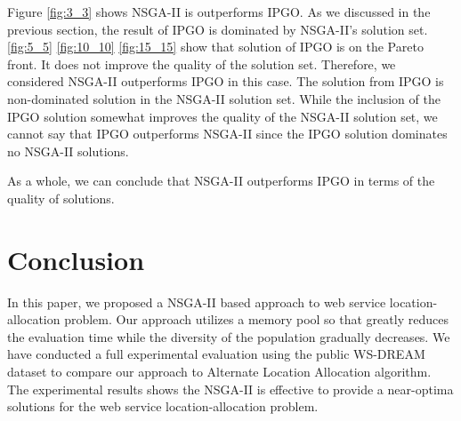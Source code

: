 \documentclass{llncs}
\begin{document}
Figure \ref{fig:3_3} shows NSGA-II is outperforms IPGO. As we discussed in the previous section, the 
result of IPGO is dominated by NSGA-II's solution set. \ref{fig:5_5} \ref{fig:10_10} \ref{fig:15_15} show that solution of IPGO is on the Pareto front. It does not improve the quality of the solution
set. Therefore, we considered NSGA-II outperforms IPGO in this case. The solution from IPGO is non-dominated solution in the NSGA-II solution set. While the inclusion
of the IPGO solution somewhat improves the quality of the NSGA-II solution set, we cannot say that IPGO outperforms NSGA-II since the 
IPGO solution dominates no NSGA-II solutions.

As a whole, we can conclude that NSGA-II outperforms IPGO in terms of the quality of solutions.


\section{Conclusion}
In this paper, we proposed a NSGA-II based approach to web service location-allocation problem. Our approach utilizes a memory pool so that
greatly reduces the evaluation time while the diversity of the population gradually decreases. We have conducted a full experimental evaluation using the public WS-DREAM dataset to compare our approach to Alternate Location Allocation algorithm. 
The experimental results shows the NSGA-II is effective to provide a near-optima solutions for the web service location-allocation problem.




\end{document}
